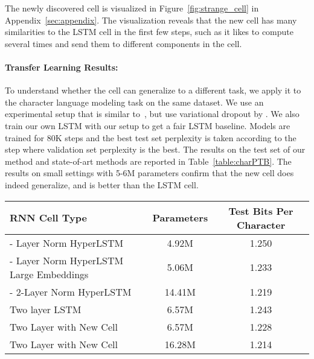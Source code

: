 \documentclass{article} \usepackage{iclr2017_conference,times}
\begin{document}
The newly discovered cell is visualized in Figure~\ref{fig:strange_cell} in Appendix~\ref{sec:appendix}. The visualization reveals that the new cell has many similarities to the LSTM cell in the first few steps, such as it likes to compute  several times and send them to different  components in the cell. 


\paragraph{Transfer Learning Results:}
To understand whether the cell can generalize to a different task, we apply it to the character language modeling task on the same dataset. We use an experimental setup that is similar to~\cite{ha2016hypernetworks}, but use variational dropout by \cite{Gal2015}. We also train our own LSTM with our setup to get a fair LSTM baseline. Models are trained for 80K steps and the best test set perplexity is taken according to the step where validation set perplexity is the best. The results on the test set of our method and state-of-art methods are reported in Table~\ref{table:charPTB}. The results on small settings with 5-6M parameters confirm that the new cell does indeed generalize, and is better than the LSTM cell. 

\begin{table*}[h!]
\center
\begin{small}
\begin{tabular}{l|cc}
\toprule
\bf RNN Cell Type & \bf Parameters &  \bf Test Bits Per Character \\
\midrule
\citet{ha2016hypernetworks} - Layer Norm HyperLSTM & 4.92M & 1.250 \\
\citet{ha2016hypernetworks} - Layer Norm HyperLSTM Large Embeddings & 5.06M & 1.233 \\
\citet{ha2016hypernetworks} - 2-Layer Norm HyperLSTM & 14.41M & 1.219 \\
\midrule
Two layer LSTM & 6.57M & 1.243 \\
Two Layer with New Cell & 6.57M & 1.228 \\
Two Layer with New Cell & 16.28M & 1.214\\
\bottomrule
\end{tabular}
\caption{Comparison between our cell and state-of-art methods on PTB character modeling. The new cell was found on word level language modeling.  }
\label{table:charPTB}
\end{small}
\end{table*}
\end{document}
